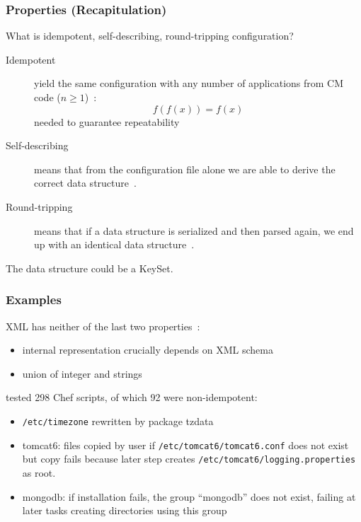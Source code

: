 \begin{frame}
	\frametitle{Properties (Recapitulation)}

	\begin{task}
	What is idempotent, self-describing, round-tripping configuration?
	\end{task}

	\pause


	\begin{description}
	\item[Idempotent]
	yield the same configuration with any number of applications from CM code ($n\ge1$)~\cite{waldemar2013testing}:
	\[
		f(f(x))=f(x)
	\]
	needed to guarantee repeatability

	\item[Self-describing]
	means that from the configuration file alone we are able to derive the correct data structure~\cite{wadler2003xml}.

	\item[Round-tripping]
	means that if a data structure is serialized and then parsed again, we end up with an identical data structure~\cite{wadler2003xml}.
	\end{description}

	The data structure could be a KeySet.
\end{frame}

\begin{frame}
	\frametitle{Examples}

	XML has neither of the last two properties~\citet{wadler2003xml}:

	\begin{itemize}[<+-| alert@+>]
	\item internal representation crucially depends on XML schema
	\item union of integer and strings
	\end{itemize}

	\pause[\thebeamerpauses]  %

	\citet{waldemar2013testing} tested 298 Chef scripts, of which 92 were non-idempotent:

	\begin{itemize}[<+-| alert@+>]
	\item \texttt{/etc/timezone} rewritten by package tzdata
	\item tomcat6: files copied by user if \texttt{/etc/tomcat6/tomcat6.conf} does not exist but copy fails because later step creates \texttt{/etc/tomcat6/logging.properties} as root.
	\item mongodb: if installation fails, the group ``mongodb'' does not exist, failing at later tasks creating directories using this group
	\end{itemize}
\end{frame}

